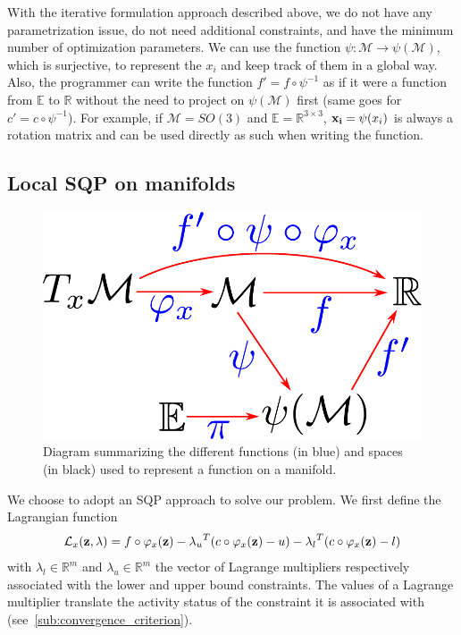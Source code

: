 With the iterative formulation approach described above, we do not have any parametrization issue, do not need additional constraints, and have the minimum number of optimization parameters.
We can use the function $\psi:\mathcal{M} \rightarrow \psi(\mathcal{M})$, which is surjective, to represent the $x_i$ and keep track of them in a global way.
Also, the programmer can write the function $f' = f \circ \psi^{-1}$ as if it were a function from $\mathbb{E}$ to $\mathbb{R}$ without the need to project on $\psi(\mathcal{M})$ first (same goes for $c' = c \circ \psi^{-1}$).
For example, if $\mathcal{M} = SO(3)$ and $\mathbb{E} = \mathbb{R}^{3\times 3}$, ${\bf x_i}=\psi(x_i)$ is always a rotation matrix and can be used directly as such when writing the function.

\subsection{Local SQP on manifolds}
\label{local_sqp_on_manifolds}

\begin{figure}[htpb]
  \centering
  \includegraphics[width=0.5\linewidth]{diagramFunction.pdf}
  \caption{Diagram summarizing the different functions (in blue) and spaces (in black) used to represent a function on a manifold.}
\label{fig:diagram_function}
\end{figure}

We choose to adopt an SQP approach to solve our problem.
We first define the Lagrangian function
\begin{equation}
  \mathcal{L}_x ({\bf z}, \lambda) = f\circ \varphi_x({\bf z}) - {\lambda_u}^T (c \circ \varphi_x({\bf z}) - u) - {\lambda_l}^T (c \circ \varphi_x({\bf z}) - l)
\end{equation}
with $\lambda_l \in \mathbb{R}^m$ and $\lambda_u \in \mathbb{R}^m$ the vector of Lagrange multipliers respectively associated with the lower and upper bound constraints.
The values of a Lagrange multiplier translate the activity status of the constraint it is associated with (see~\ref{sub:convergence_criterion}).

